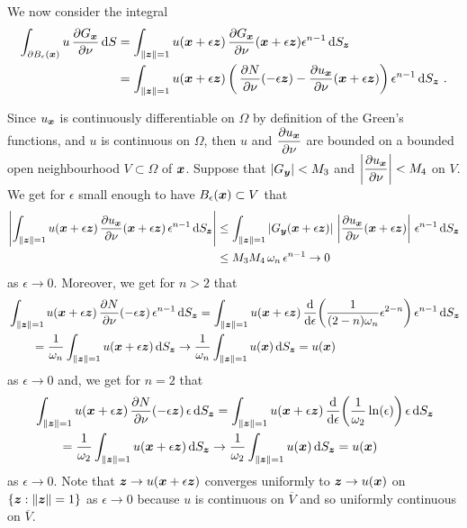 We now consider the integral
\begin{align*}
\int_{\partial B_\epsilon({\bm{x}})}
u\,\frac{\partial{G_{{\bm{x}}}}}{\partial \nu} \,\mathrm{d}{S}
&=  \int_{\|{\bm{z}}\|=1} u({\bm{x}}+\epsilon {\bm{z}})
\,\frac{\partial{G_{{\bm{x}}}}}{\partial \nu}({\bm{x}}+\epsilon {\bm{z}})
\epsilon^{n-1}\,\mathrm{d}{S}_{{\bm{z}}} \\
&= \int_{\|{\bm{z}}\|=1} u({\bm{x}}+\epsilon {\bm{z}})
\left( \,\frac{\partial{N}}{\partial \nu}(-\epsilon {\bm{z}})
- \frac{\partial{u_{{\bm{x}}}}}{\partial \nu}({\bm{x}}+\epsilon {\bm{z}}) \right)
\epsilon^{n-1}\,\mathrm{d}{S}_{{\bm{z}}} \ .
\end{align*}

Since $u_{{\bm{x}}}$ is continuously differentiable on $\Omega$ by
definition of the Green's functions, and $u$ is continuous
on $\Omega$, then $u$ and
$\displaystyle \frac{\partial{u_{{\bm{x}}}}}{\partial \nu}$ are bounded on a
bounded open neighbourhood $V \subset \Omega$ of ${\bm{x}}$.  Suppose that
$|G_{{\bm{y}}}| < M_3$ and
$\displaystyle \left| \frac{\partial{u_{{\bm{x}}}}}{\partial \nu}\right|< M_4$
on $V$.  We get for $\epsilon$
small enough to have $B_\epsilon({\bm{x}}) \subset V$ that
\begin{align*}
\left| \int_{\|{\bm{z}}\|=1} u({\bm{x}}+\epsilon {\bm{z}})
\,\frac{\partial{u_{{\bm{x}}}}}{\partial \nu}({\bm{x}}+\epsilon {\bm{z}})
\, \epsilon^{n-1} \,\mathrm{d}{S}_{{\bm{z}}} \right|
& \leq \int_{\|{\bm{z}}\|=1}
\left| G_{{\bm{y}}}({\bm{x}} + \epsilon {\bm{z}}) \right|
\, \left|\frac{\partial{u_{{\bm{x}}}}}{\partial \nu}({\bm{x}}+\epsilon {\bm{z}})
\right| \, \epsilon^{n-1} \,\mathrm{d}{S}_{{\bm{z}}} \\
& \leq M_3 M_4\, \omega_n\, \epsilon^{n-1}  \to 0
\end{align*}
as $\epsilon \to 0$.  Moreover, we get for $n>2$ that
\begin{align*}
&\int_{\|{\bm{z}}\|=1}
u({\bm{x}}+\epsilon {\bm{z}})
\,\frac{\partial{N}}{\partial \nu}(-\epsilon {\bm{z}})\, \epsilon^{n-1}\,\mathrm{d}{S}_{{\bm{z}}}
= \int_{\|{\bm{z}}\|=1} u({\bm{x}}+\epsilon {\bm{z}})
\,\frac{\mathrm{d}}{\mathrm{d}{\epsilon}}{ \left(\frac{1}{(2-n)\omega_n} \epsilon^{2-n}\right) }
\, \epsilon^{n-1}\,\mathrm{d}{S}_{{\bm{z}}} \\
&\qquad = \frac{1}{\omega_n} \int_{\|{\bm{z}}\|=1}
u({\bm{x}}+\epsilon {\bm{z}}) \,\mathrm{d}{S}_{{\bm{z}}}
\to 
\frac{1}{\omega_n} \int_{\|{\bm{z}}\|=1} u({\bm{x}}) \,\mathrm{d}{S}_{{\bm{z}}}
= u({\bm{x}})
\end{align*}
as $\epsilon \to 0$ and, we get for $n=2$ that
\begin{align*}
&\int_{\|{\bm{z}}\|=1}
u({\bm{x}}+\epsilon {\bm{z}})
\,\frac{\partial{N}}{\partial \nu}(-\epsilon {\bm{z}})\, \epsilon \,\mathrm{d}{S}_{{\bm{z}}}
= \int_{\|{\bm{z}}\|=1} u({\bm{x}}+\epsilon {\bm{z}})
\,\frac{\mathrm{d}}{\mathrm{d}{\epsilon}}{ \left(\frac{1}{\omega_2} \ln(\epsilon) \right) }
\, \epsilon \,\mathrm{d}{S}_{{\bm{z}}} \\
& \qquad = \frac{1}{\omega_2} \int_{\|{\bm{z}}\|=1}
u({\bm{x}}+\epsilon {\bm{z}}) \,\mathrm{d}{S}_{{\bm{z}}}
\to
\frac{1}{\omega_2} \int_{\|{\bm{z}}\|=1} u({\bm{x}}) \,\mathrm{d}{S}_{{\bm{z}}}
= u({\bm{x}})
\end{align*}
as $\epsilon \to 0$. Note that ${\bm{z}} \to u({\bm{x}}+\epsilon {\bm{z}})$
converges uniformly to ${\bm{z}} \to u({\bm{x}})$ on
$\{ {\bm{z}} : \|{\bm{z}}\| = 1\}$ as $\epsilon \to 0$ because
$u$ is continuous on $\overline{V}$ and so uniformly continuous
on $\overline{V}$.

